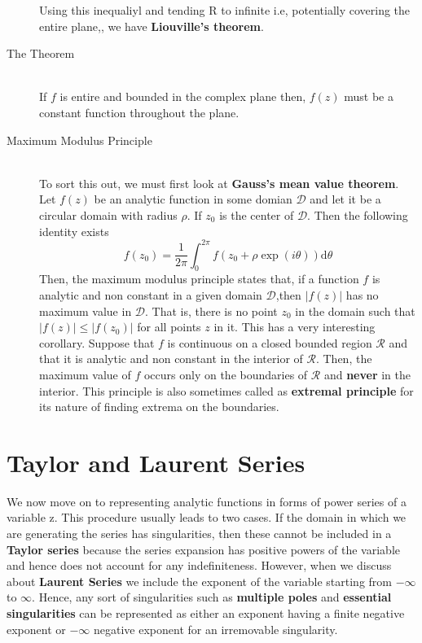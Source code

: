 \documentclass[11pt]{article}
\begin{document}
\begin{sloppypar}
\begin{description}
Using this inequaliyl and tending R to infinite i.e, potentially covering the entire plane,, we have \textbf{Liouville\rq{}s theorem}.

\item[The Theorem] \hfill \\
If $f$ is entire and bounded in the complex plane then, $f(z)$ must be a constant function throughout the plane.

\item[Maximum Modulus Principle] \hfill \\
	To sort this out, we must first look at \textbf{Gauss\rq{}s mean value theorem}. Let $f(z)$ be an analytic function in some domian $\mathcal{D}$ and let it be a circular domain with radius $\rho$. If $z_{0}$ is the center of $\mathcal{D}$. Then the following identity exists
$$f(z_{0}) = \frac{1}{2\pi}\int_0^{2\pi} f(z_{0} + \rho\exp(i\theta))\mathrm{d}\theta$$
	Then, the maximum modulus principle states that, if a function $f$ is analytic and non constant in a given domain $\mathcal{D}$,then $|f(z)|$ has no maximum value in $\mathcal{D}$. That is, there is no point $z_{0}$ in the domain such that $|f(z)| \leq |f(z_{0})|$ for all points $z$ in it.  This has a very interesting corollary. Suppose that $f$ is continuous on a closed bounded region $\mathcal{R}$ and that it is analytic and non constant in the interior of $\mathcal{R}$. Then, the maximum value of $f$ occurs only on the boundaries of $\mathcal{R}$ and \textbf{never} in the interior. This principle is also sometimes called as \textbf{extremal principle} for its nature of finding extrema on the boundaries.
\end{description}
\section{Taylor and Laurent Series}
 We now move on to representing analytic functions in forms of power series of a variable z. This procedure usually leads to two cases. If the domain in which we are generating the series has singularities, then these cannot be included in a \textbf{Taylor series} because the series expansion has positive powers of the variable and hence does not account for any indefiniteness. However, when we discuss about \textbf{Laurent Series} we include the exponent of the variable starting from $-\infty$ to $\infty$. Hence, any sort of singularities such as \textbf{multiple poles} and \textbf{essential singularities} can be represented as either an exponent having a finite negative exponent or $-\infty$ negative exponent for an irremovable singularity.


\end{sloppypar}
\end{document}
